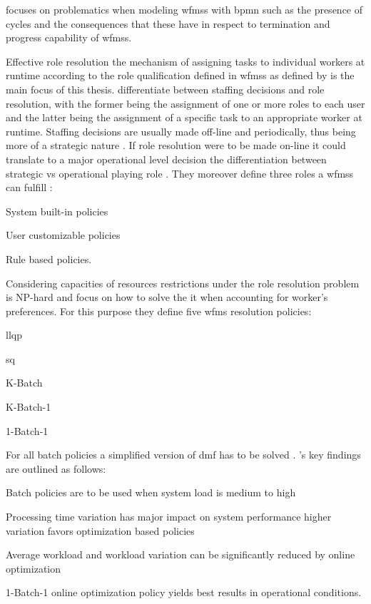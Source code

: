 \citet{Soerensen2005} focuses on problematics when modeling \glspl{wfms} with \gls{bpmn} such as the presence of cycles and the consequences that these have in respect to termination and progress capability of \glspl{wfms}.

Effective role resolution \ie the mechanism of assigning tasks to individual workers at runtime according to the role qualification defined in \glspl{wfms} as defined by \citet{Zeng2005} is the main focus of this thesis.
\citet{Zeng2005} differentiate between staffing decisions and role resolution, with the former being the assignment of one or more roles to each user and the latter being the assignment of a specific task to an appropriate worker at runtime. Staffing decisions are usually made off-line and periodically, thus being more of a strategic nature \citep{Zeng2005}. If role resolution were to be made on-line it could translate to a major operational level decision \ie the differentiation between strategic vs operational playing role \citep{Zeng2005}.
They moreover define three roles a \glspl{wfms} can fulfill \citep{Zeng2005}:
\begin{enumerate*}
	\item System built-in policies
	\item User customizable policies
	\item Rule based policies.
\end{enumerate*}
Considering capacities of resources restrictions under the role resolution problem is NP-hard and \citet{Zeng2005} focus on how to solve the it when accounting for worker's preferences. For this purpose they define five \gls{wfms} resolution policies:
\begin{enumerate*}
	\item \gls{llqp}
	\item \gls{sq}
	\item K-Batch
	\item K-Batch-1
	\item 1-Batch-1
\end{enumerate*}
For all batch policies a simplified version of \gls{dmf} has to be solved \citep{Zeng2005}.
\citet{Zeng2005}'s key findings are outlined as follows:
\begin{enumerate*}
	\item Batch policies are to be used when system load is medium to high
	\item Processing time variation has major impact on system performance \ie higher variation favors optimization based policies
	\item Average workload and workload variation can be significantly reduced by online optimization
	\item 1-Batch-1 online optimization policy yields best results in operational conditions.
\end{enumerate*}

